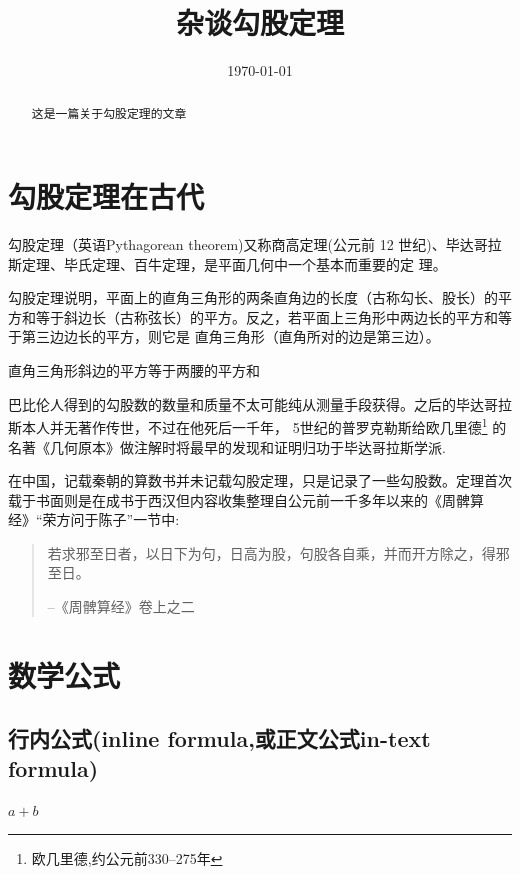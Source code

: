 \documentclass[UTF8]{ctexart}
\title{\heiti 杂谈勾股定理}
\author{\kaishu张三}
\date{\today}
\begin{document}
  \maketitle %
  \begin{abstract}
    这是一篇关于勾股定理的文章
  \end{abstract}
  \tableofcontents %
  \section{勾股定理在古代}
    勾股定理（英语Pythagorean theorem)又称商高定理(公元前 12 世纪)、毕达哥拉斯定理、毕氏定理、百牛定理，是平面几何中一个基本而重要的定 理。\cite{Kline}

    勾股定理说明，平面上的直角三角形的两条直角边的长度（古称勾长、股长）的平方和等于斜边长（古称弦长）的平方。反之，若平面上三角形中两边长的平方和等于第三边边长的平方，则它是
    直角三角形（直角所对的边是第三边）。\cite{quanjing}

    \begin{thm}[勾股定理]
      直角三角形斜边的平方等于两腰的平方和
    \end{thm}

    巴比伦人得到的勾股数的数量和质量不太可能纯从测量手段获得。之后的毕达哥拉斯本人并无著作传世，不过在他死后一千年，
    5世纪的普罗克勒斯给欧几里德\footnote{欧几里德,约公元前330--275年}
    的名著《几何原本》做注解时将最早的发现和证明归功于毕达哥拉斯学派.

    在中国，记载秦朝的算数书并未记载勾股定理，只是记录了一些勾股数。定理首次载于书面则是在成书于西汉但内容收集整理自公元前一千多年以来的《周髀算经》“荣方问于陈子”一节中:
    \begin{quote}%
    \kaishu%
      若求邪至日者，以日下为句，日高为股，句股各自乘，并而开方除之，得邪至日。

      --《周髀算经》卷上之二
    \end{quote}

  \section{数学公式}
    \subsection{行内公式(inline formula,或正文公式in-text formula)}
      $a+b$
\end{document}

